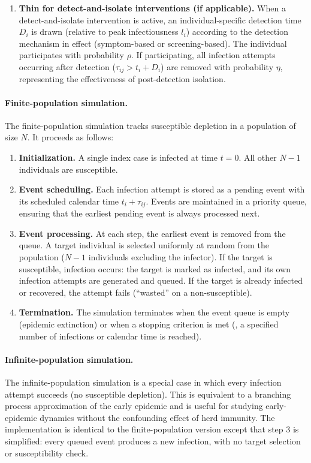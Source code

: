 \begin{enumerate}
  \item \textbf{Thin for detect-and-isolate interventions (if applicable).} When a detect-and-isolate intervention is active, an individual-specific detection time $D_i$ is drawn (relative to peak infectiousness $l_i$) according to the detection mechanism in effect (symptom-based or screening-based). The individual participates with probability $\rho$. If participating, all infection attempts occurring after detection ($\tau_{ij} > t_i + D_i$) are removed with probability $\eta$, representing the effectiveness of post-detection isolation.
\end{enumerate}

\paragraph{Finite-population simulation.}
The finite-population simulation tracks susceptible depletion in a population of size $N$. It proceeds as follows:
\begin{enumerate}
  \item \textbf{Initialization.} A single index case is infected at time $t = 0$. All other $N-1$ individuals are susceptible.
  \item \textbf{Event scheduling.} Each infection attempt is stored as a pending event with its scheduled calendar time $t_i + \tau_{ij}$. Events are maintained in a priority queue, ensuring that the earliest pending event is always processed next.
  \item \textbf{Event processing.} At each step, the earliest event is removed from the queue. A target individual is selected uniformly at random from the population ($N - 1$ individuals excluding the infector). If the target is susceptible, infection occurs: the target is marked as infected, and its own infection attempts are generated and queued. If the target is already infected or recovered, the attempt fails (``wasted'' on a non-susceptible).
  \item \textbf{Termination.} The simulation terminates when the event queue is empty (epidemic extinction) or when a stopping criterion is met (\eg, a specified number of infections or calendar time is reached).
\end{enumerate}

\paragraph{Infinite-population simulation.}
The infinite-population simulation is a special case in which every infection attempt succeeds (no susceptible depletion). This is equivalent to a branching process approximation of the early epidemic and is useful for studying early-epidemic dynamics without the confounding effect of herd immunity. The implementation is identical to the finite-population version except that step 3 is simplified: every queued event produces a new infection, with no target selection or susceptibility check.

